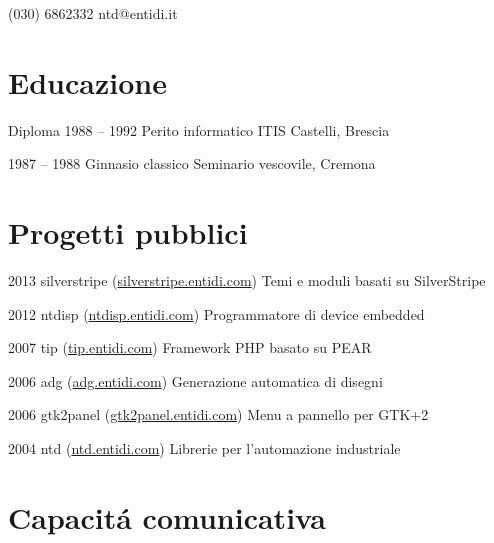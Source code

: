 \documentclass[10pt]{tccv}
\begin{document}
    {(030) 6862332}
    {ntd@entidi.it}

\section{Educazione}

\begin{yearlist}

\item[Diploma]{1988 -- 1992}
     {Perito informatico}
     {ITIS Castelli, Brescia}

\item{1987 -- 1988}
     {Ginnasio classico}
     {Seminario vescovile, Cremona}

\end{yearlist}

\section{Progetti pubblici}

\begin{yearlist}

\item{2013}
     {silverstripe (\href{http://silverstripe.entidi.com/}{silverstripe.entidi.com})}
     {Temi e moduli basati su SilverStripe}

\item{2012}
     {ntdisp (\href{http://ntdisp.entidi.com/}{ntdisp.entidi.com})}
     {Programmatore di device embedded}

\item{2007}
     {tip (\href{http://tip.entidi.com/}{tip.entidi.com})}
     {Framework PHP basato su PEAR}

\item{2006}
     {adg (\href{http://adg.entidi.com/}{adg.entidi.com})}
     {Generazione automatica di disegni}

\item{2006}
     {gtk2panel (\href{http://gtk2panel.entidi.com/}{gtk2panel.entidi.com})}
     {Menu a pannello per GTK+2}

\item{2004}
     {ntd (\href{http://ntd.entidi.com/}{ntd.entidi.com})}
     {Librerie per l'automazione industriale}

\end{yearlist}

\section{Capacit\'a comunicativa}
\end{document}
